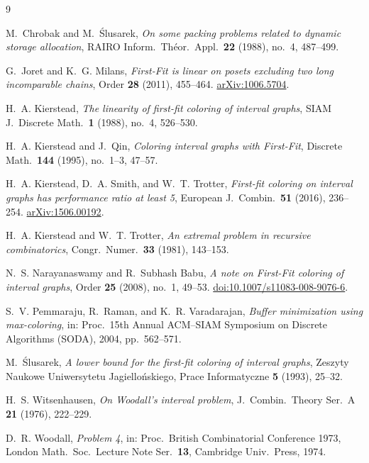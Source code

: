 \documentclass[11pt,a4paper]{article}
\theoremstyle{remark}
\begin{document}
\begin{thebibliography}{9}

M.~Chrobak and M.~\'{S}lusarek,
\emph{On some packing problems related to dynamic storage allocation},
RAIRO Inform.\ Th\'{e}or.\ Appl.\ \textbf{22} (1988), no.~4, 487--499.

G.~Joret and K.~G. Milans,
\emph{First-Fit is linear on posets excluding two long incomparable chains},
Order \textbf{28} (2011), 455--464.
\href{https://arxiv.org/abs/1006.5704}{arXiv:1006.5704}.

H.~A. Kierstead,
\emph{The linearity of first-fit coloring of interval graphs},
SIAM J.\ Discrete Math.\ \textbf{1} (1988), no.~4, 526--530.

H.~A. Kierstead and J.~Qin,
\emph{Coloring interval graphs with First-Fit},
Discrete Math.\ \textbf{144} (1995), no.~1--3, 47--57.

H.~A. Kierstead, D.~A. Smith, and W.~T. Trotter,
\emph{First-fit coloring on interval graphs has performance ratio at least 5},
European J.\ Combin.\ \textbf{51} (2016), 236--254.
\href{https://arxiv.org/abs/1506.00192}{arXiv:1506.00192}.

H.~A. Kierstead and W.~T. Trotter,
\emph{An extremal problem in recursive combinatorics},
Congr.\ Numer.\ \textbf{33} (1981), 143--153.

N.~S. Narayanaswamy and R.~Subhash Babu,
\emph{A note on First-Fit coloring of interval graphs},
Order \textbf{25} (2008), no.~1, 49--53.
\href{https://doi.org/10.1007/s11083-008-9076-6}{doi:10.1007/s11083-008-9076-6}.

S.~V. Pemmaraju, R.~Raman, and K.~R. Varadarajan,
\emph{Buffer minimization using max-coloring},
in: Proc.\ 15th Annual ACM--SIAM Symposium on Discrete Algorithms (SODA), 2004, pp.~562--571.

M.~\'{S}lusarek,
\emph{A lower bound for the first-fit coloring of interval graphs},
Zeszyty Naukowe Uniwersytetu Jagiello\'{n}skiego, Prace Informatyczne \textbf{5} (1993), 25--32.

H.~S. Witsenhausen,
\emph{On Woodall's interval problem},
J.\ Combin.\ Theory Ser.\ A \textbf{21} (1976), 222--229.

D.~R. Woodall,
\emph{Problem 4},
in: Proc.\ British Combinatorial Conference 1973, London Math.\ Soc.\ Lecture Note Ser.\ \textbf{13}, Cambridge Univ.\ Press, 1974.

\end{thebibliography}
\end{document}
